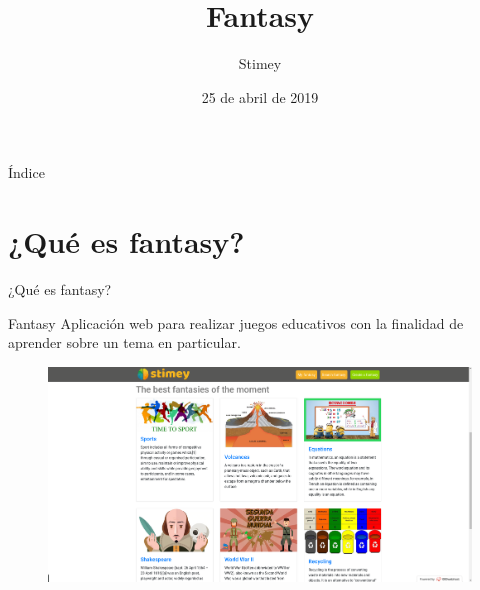 \documentclass[aspectratio=169]{beamer}
\title{Fantasy}
\author{Stimey}
\date{25 de abril de 2019}
\begin{document}
\begin{frame}
  \titlepage
  
\end{frame}

\begin{frame}{Índice}
  \tableofcontents
\end{frame}

\section{¿Qué es fantasy?}
\begin{frame}{¿Qué es fantasy?}
\begin{block}{Fantasy}
	Aplicación web para realizar juegos educativos con la finalidad de aprender sobre un tema en particular.
\end{block}
\begin{figure}[h]
	\centering
	\includegraphics[scale=0.2]{Fantasy.png}
\end{figure}
\end{frame}
\end{document}
